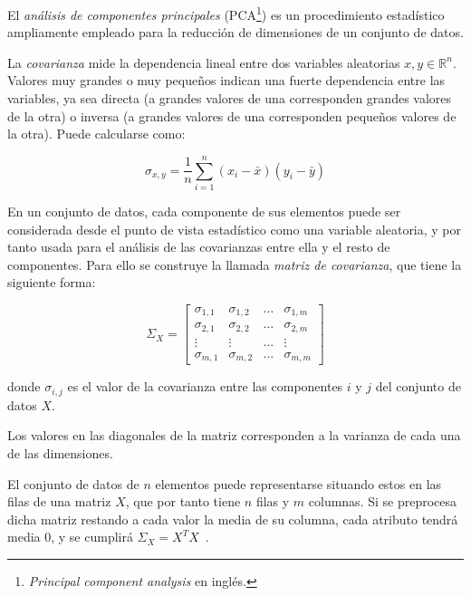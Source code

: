 El \textit{análisis de componentes principales} (PCA\footnote{\textit{Principal component analysis} en inglés.}) es un procedimiento estadístico ampliamente empleado para la reducción de dimensiones de un conjunto de datos.

La \textit{covarianza} mide la dependencia lineal entre dos variables aleatorias $x,y\in \mathbb{R}^n$.
Valores muy grandes o muy pequeños indican una fuerte dependencia entre las variables, ya sea directa (a grandes valores de una corresponden grandes valores de la otra) o inversa (a grandes valores de una corresponden pequeños valores de la otra).
Puede calcularse como:

\begin{equation}
    \label{eq:covariance}
    \sigma_{x,y} = \frac{1}{n}\sum_{i=1}^{n}{(x_i - \bar{x})(y_i - \bar{y})}
\end{equation}

En un conjunto de datos, cada componente de sus elementos puede ser considerada desde el punto de vista estadístico como una variable aleatoria, y por tanto usada para el análisis de las covarianzas entre ella y el resto de componentes.
Para ello se construye la llamada \textit{matriz de covarianza}, que tiene la siguiente forma:

\begin{equation}
    \label{eq:covariance-matrix}
    \Sigma_X = \begin{bmatrix}
                   \sigma_{1,1} & \sigma_{1,2} & \ldots & \sigma_{1,m} \\
                   \sigma_{2,1} & \sigma_{2,2} & \ldots & \sigma_{2,m} \\
                   \vdots & \vdots & \ldots & \vdots \\
                   \sigma_{m,1} & \sigma_{m,2} & \ldots & \sigma_{m,m}
    \end{bmatrix}
\end{equation}

\noindent
donde $\sigma_{i,j}$ es el valor de la covarianza entre las componentes $i$ y $j$ del conjunto de datos $X$.

Los valores en las diagonales de la matriz corresponden a la varianza de cada una de las dimensiones.

El conjunto de datos de $n$ elementos puede representarse situando estos en las filas de una matriz $X$, que por tanto tiene $n$ filas y $m$ columnas.
Si se preprocesa dicha matriz restando a cada valor la media de su columna, cada atributo tendrá media 0, y se cumplirá $\Sigma_X = X^T X$~\cite{Tan05}.

